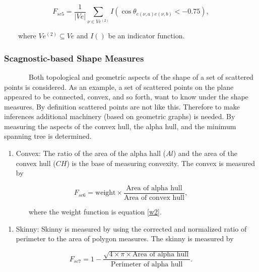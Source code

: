 \documentclass{article}
\newcommand{\tightlist}{%
\setlength{\itemsep}{0pt}\setlength{\parskip}{0pt}}
\begin{document}
\begin{equation}
    F_{sc5} = \frac{1}{|Ve|}\sum_{\nu \in Ve^{(2)}}^{}I(\cos\theta_{e(\nu,a)e(\nu,b)}<-0.75),
\end{equation}

~~~~where \(Ve^{(2)} \subseteq Ve\) and \(I()\) be an indicator
function.

\hypertarget{scagnostic-based-shape-measures}{%
\subsubsection{Scagnostic-based Shape
Measures}\label{scagnostic-based-shape-measures}}

~~~~~~~Both topological and geometric aspects of the shape of a set of
scattered points is considered. As an example, a set of scattered points
on the plane appeared to be connected, convex, and so forth, want to know
under the shape measures. By definition scattered points are not like
this. Therefore to make inferences additional machinery (based on
geometric graphs) is needed. By measuring the aspects of the convex
hull, the alpha hull, and the minimum spanning tree is determined.

\begin{enumerate}
\def\labelenumi{\roman{enumi})}
\tightlist
\item
  Convex: The ratio of the area of the alpha hall (\(Al\)) and the area
  of the convex hull (\(CH\)) is the base of measuring convexity. The
  convex is measured by
\end{enumerate}

\begin{equation}
    F_{sc6} = \text{weight} \times \frac{\text{Area of alpha hull}}{\text{Area of convex hull}},
\end{equation}

~~~~~~~where the weight function is equation \ref{w2}.

\begin{enumerate}
\def\labelenumi{\roman{enumi})}
\setcounter{enumi}{1}
\tightlist
\item
  Skinny: Skinny is measured by using the corrected and normalized ratio
  of perimeter to the area of polygon measures. The skinny is measured by
\end{enumerate}

\begin{equation}
    F_{sc7} = 1- \frac{\sqrt{4 \times \pi \times \text{Area of alpha hull}}}{\text{Perimeter of alpha hull}}.
\end{equation}
\end{document}
